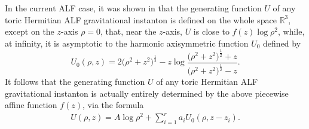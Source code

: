 \documentclass[pdftex]{sigma}
\numberwithin{equation}{section}
\begin{document}
In the current ALF case, it was shown in \cite[Section~5]{BG} that the generating function $U$ of any toric Hermitian ALF gravitational instanton is defined on the whole space $\mathbb{R} ^3$, except on the $z$-axis $\rho = 0$, that, near the $z$-axis, $U$ is close to $f (z) \log{\rho ^2}$, while, at infinity, it is asymptotic to the harmonic axisymmetric function $U_0$ defined by
\[%
 U _0 (\rho, z) = 2 \big(\rho ^2 + z ^2\big) ^{\frac{1}{2}} - z \log{\frac{\big(\rho ^2 + z^2\big) ^{\frac{1}{2}} + z}{\big(\rho ^2 + z^2\big) ^{\frac{1}{2}}- z}}.\]
It follows that the generating function $U$ of any toric Hermitian ALF gravitational instanton is actually entirely determined by the above piecewise affine function $f (z)$, via the formula
\begin{gather} \label{U} U (\rho, z) = A \log{\rho ^2} + \sum _{i = 1} ^r a _i U_0 (\rho, z - z_i). \end{gather}
\end{document}
